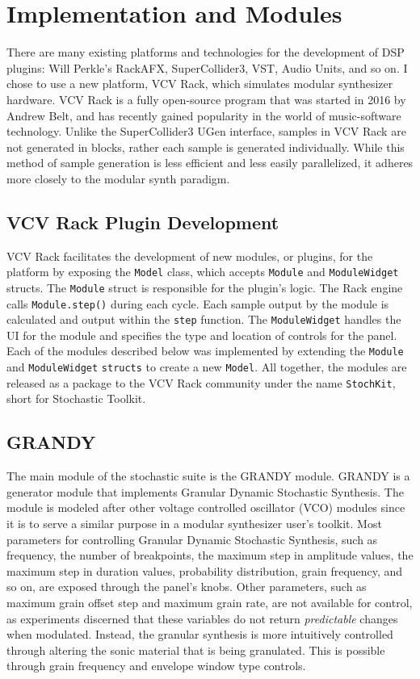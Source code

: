 \documentclass[10pt]{article}
\begin{document}
\section{Implementation and Modules}
There are many existing platforms and technologies for the development of DSP plugins: Will Perkle's RackAFX, SuperCollider3, VST, Audio Units, and so on.\citep{rackafx} I chose to use a new platform, VCV Rack, which simulates modular synthesizer hardware. VCV Rack is a fully open-source program that was started in 2016 by Andrew Belt, and has recently gained popularity in the world of music-software technology.\citep{vcvrack} Unlike the SuperCollider3 UGen interface, samples in VCV Rack are not generated in blocks, rather each sample is generated individually. While this method of sample generation is less efficient and less easily parallelized, it adheres more closely to the modular synth paradigm.

\subsection{VCV Rack Plugin Development}

VCV Rack facilitates the development of new modules, or plugins, for the platform by exposing the \texttt{Model} class, which accepts \texttt{Module} and \texttt{ModuleWidget} structs. The \texttt{Module} struct is responsible for the plugin's logic. The Rack engine calls \texttt{Module.step()} during each cycle. Each sample output by the module is calculated and output within the \texttt{step} function. The \texttt{ModuleWidget} handles the UI for the module and specifies the type and location of controls for the panel. Each of the modules described below was implemented by extending the \texttt{Module} and \texttt{ModuleWidget} \texttt{structs} to create a new \texttt{Model}. All together, the modules are released as a package to the VCV Rack community under the name \texttt{StochKit}, short for Stochastic Toolkit.

\subsection{GRANDY}
The main module of the stochastic suite is the GRANDY module. GRANDY is a generator module that implements Granular Dynamic Stochastic Synthesis. The module is modeled after other voltage controlled oscillator (VCO) modules since it is to serve a similar purpose in a modular synthesizer user's toolkit. Most parameters for controlling Granular Dynamic Stochastic Synthesis, such as frequency, the number of breakpoints, the maximum step in amplitude values, the maximum step in duration values, probability distribution, grain frequency, and so on, are exposed through the panel's knobs. Other parameters, such as maximum grain offset step and maximum grain rate, are not available for control, as experiments discerned that these variables do not return \textit{predictable} changes when modulated. Instead, the granular synthesis is more intuitively controlled through altering the sonic material that is being granulated. This is possible through grain frequency and envelope window type controls.
\end{document}
